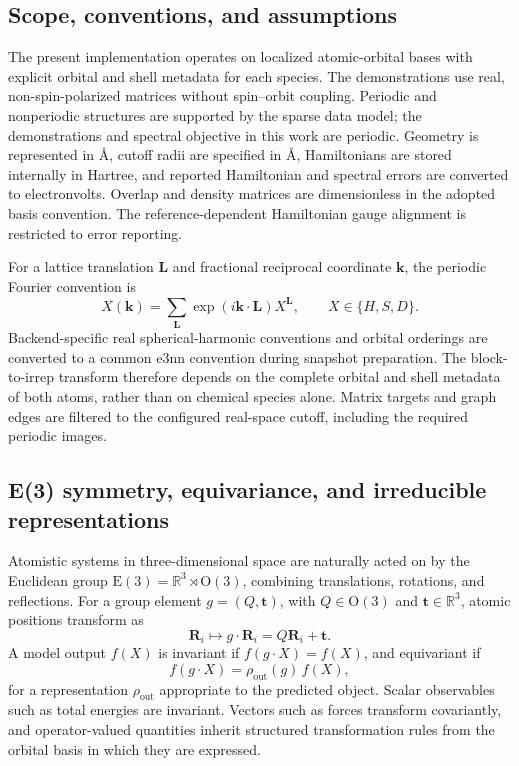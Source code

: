 \documentclass[preprint,12pt,compress,numafflabel]{elsarticle}
\begin{document}
\subsection{Scope, conventions, and assumptions}
\label{subsec:scope-conventions}

The present implementation operates on localized atomic-orbital bases with explicit orbital and shell metadata for each species. The demonstrations use real, non-spin-polarized matrices without spin--orbit coupling. Periodic and nonperiodic structures are supported by the sparse data model; the demonstrations and spectral objective in this work are periodic. Geometry is represented in \r{A}, cutoff radii are specified in \r{A}, Hamiltonians are stored internally in Hartree, and reported Hamiltonian and spectral errors are converted to electronvolts. Overlap and density matrices are dimensionless in the adopted basis convention. The reference-dependent Hamiltonian gauge alignment is restricted to error reporting.

For a lattice translation $\bm{L}$ and fractional reciprocal coordinate $\bm{k}$, the periodic Fourier convention is
\begin{equation}
X(\bm{k})=\sum_{\bm{L}}\exp\!\left(i\bm{k}\cdot\bm{L}\right)X^{\bm{L}},
\qquad X\in\{H,S,D\}.
\end{equation}
Backend-specific real spherical-harmonic conventions and orbital orderings are converted to a common e3nn convention during snapshot preparation. The block-to-irrep transform therefore depends on the complete orbital and shell metadata of both atoms, rather than on chemical species alone. Matrix targets and graph edges are filtered to the configured real-space cutoff, including the required periodic images.


\subsection{E(3) symmetry, equivariance, and irreducible representations}
\label{subsec:egnn_background}

Atomistic systems in three-dimensional space are naturally acted on by the Euclidean group $\mathrm{E}(3)=\mathbb{R}^3 \rtimes \mathrm{O}(3)$, combining translations, rotations, and reflections.
For a group element $g=(Q,\bm{t})$, with $Q \in \mathrm{O}(3)$ and $\bm{t}\in\mathbb{R}^3$, atomic positions transform as
\begin{equation}
\bm{R}_i \mapsto g \cdot \bm{R}_i = Q \bm{R}_i + \bm{t}.
\end{equation}
A model output $f(X)$ is invariant if $f(g \cdot X)=f(X)$, and equivariant if
\begin{equation}
f(g \cdot X) = \rho_{\mathrm{out}}(g)\, f(X),
\end{equation}
for a representation $\rho_{\mathrm{out}}$ appropriate to the predicted object.
Scalar observables such as total energies are invariant. Vectors such as forces transform covariantly, and operator-valued quantities inherit structured transformation rules from the orbital basis in which they are expressed.
\end{document}
